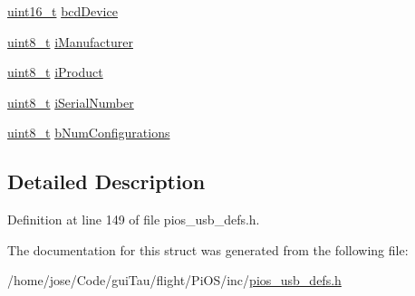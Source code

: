 \begin{DoxyCompactItemize}
\item 
\hyperlink{stdint_8h_a273cf69d639a59973b6019625df33e30}{uint16\-\_\-t} \hyperlink{group___p_i_o_s___u_s_b___d_e_f_s_ga4c68faa7a3ea8607c0d9aeb9cc755169}{bcd\-Device}
\item 
\hyperlink{stdint_8h_aba7bc1797add20fe3efdf37ced1182c5}{uint8\-\_\-t} \hyperlink{group___p_i_o_s___u_s_b___d_e_f_s_gabaeafe49bb2dac8e1a9d55a693300c6d}{i\-Manufacturer}
\item 
\hyperlink{stdint_8h_aba7bc1797add20fe3efdf37ced1182c5}{uint8\-\_\-t} \hyperlink{group___p_i_o_s___u_s_b___d_e_f_s_ga1aa83bdef33f6f67cef07ee0e0cbe7b1}{i\-Product}
\item 
\hyperlink{stdint_8h_aba7bc1797add20fe3efdf37ced1182c5}{uint8\-\_\-t} \hyperlink{group___p_i_o_s___u_s_b___d_e_f_s_gae04d0f21a04c4db709e0a05dcb9ecd3a}{i\-Serial\-Number}
\item 
\hyperlink{stdint_8h_aba7bc1797add20fe3efdf37ced1182c5}{uint8\-\_\-t} \hyperlink{group___p_i_o_s___u_s_b___d_e_f_s_ga65e3f56a6dc737eb78053a7ad50d75f8}{b\-Num\-Configurations}
\end{DoxyCompactItemize}


\subsection{Detailed Description}


Definition at line 149 of file pios\-\_\-usb\-\_\-defs.\-h.



The documentation for this struct was generated from the following file\-:\begin{DoxyCompactItemize}
\item 
/home/jose/\-Code/gui\-Tau/flight/\-Pi\-O\-S/inc/\hyperlink{pios__usb__defs_8h}{pios\-\_\-usb\-\_\-defs.\-h}\end{DoxyCompactItemize}
